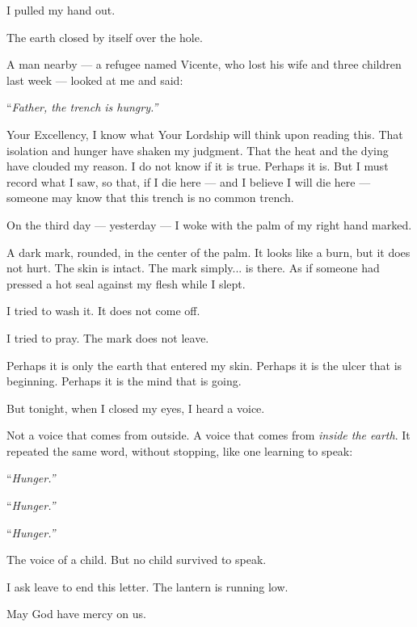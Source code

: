\noindent I pulled my hand out.

\noindent The earth closed by itself over the hole.

\noindent A man nearby --- a refugee named Vicente, who lost his wife and three children last week --- looked at me and said:

\noindent \textquotedblleft{\textit{Father, the trench is hungry.\textquotedblright{}}}

\noindent Your Excellency, I know what Your Lordship will think upon reading this. That isolation and hunger have shaken my judgment. That the heat and the dying have clouded my reason. I do not know if it is true. Perhaps it is. But I must record what I saw, so that, if I die here --- and I believe I will die here --- someone may know that this trench is no common trench.

\noindent On the third day --- yesterday --- I woke with the palm of my right hand marked.

\noindent A dark mark, rounded, in the center of the palm. It looks like a burn, but it does not hurt. The skin is intact. The mark simply... is there. As if someone had pressed a hot seal against my flesh while I slept.

\noindent I tried to wash it. It does not come off.

\noindent I tried to pray. The mark does not leave.

\noindent Perhaps it is only the earth that entered my skin. Perhaps it is the ulcer that is beginning. Perhaps it is the mind that is going.

\noindent But tonight, when I closed my eyes, I heard a voice.

\noindent Not a voice that comes from outside. A voice that comes from \textit{inside the earth}. It repeated the same word, without stopping, like one learning to speak:

\noindent \textquotedblleft{\textit{Hunger.\textquotedblright{}}}

\noindent \textquotedblleft{\textit{Hunger.\textquotedblright{}}}

\noindent \textquotedblleft{\textit{Hunger.\textquotedblright{}}}

\noindent The voice of a child. But no child survived to speak.

\noindent I ask leave to end this letter. The lantern is running low.

\noindent May God have mercy on us.

